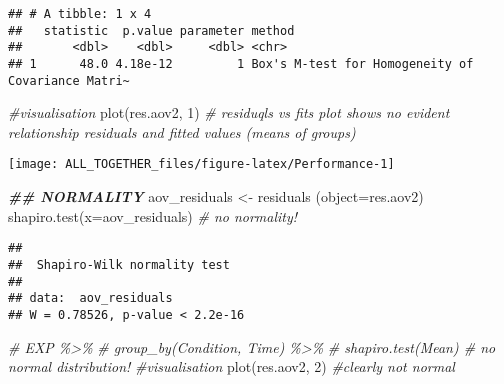 \documentclass[
]{article}
\newenvironment{Shaded}{\begin{snugshade}}{\end{snugshade}}
\newcommand{\AttributeTok}[1]{\textcolor[rgb]{0.77,0.63,0.00}{#1}}
\newcommand{\CommentTok}[1]{\textcolor[rgb]{0.56,0.35,0.01}{\textit{#1}}}
\newcommand{\ConstantTok}[1]{\textcolor[rgb]{0.00,0.00,0.00}{#1}}
\newcommand{\DecValTok}[1]{\textcolor[rgb]{0.00,0.00,0.81}{#1}}
\newcommand{\DocumentationTok}[1]{\textcolor[rgb]{0.56,0.35,0.01}{\textbf{\textit{#1}}}}
\newcommand{\FunctionTok}[1]{\textcolor[rgb]{0.00,0.00,0.00}{#1}}
\newcommand{\NormalTok}[1]{#1}
\newcommand{\OtherTok}[1]{\textcolor[rgb]{0.56,0.35,0.01}{#1}}
\newcommand{\SpecialCharTok}[1]{\textcolor[rgb]{0.00,0.00,0.00}{#1}}
\newcommand{\StringTok}[1]{\textcolor[rgb]{0.31,0.60,0.02}{#1}}
\begin{document}
\begin{Shaded}
\end{Shaded}

\begin{verbatim}
## # A tibble: 1 x 4
##   statistic  p.value parameter method                                           
##       <dbl>    <dbl>     <dbl> <chr>                                            
## 1      48.0 4.18e-12         1 Box's M-test for Homogeneity of Covariance Matri~
\end{verbatim}

\begin{Shaded}
\begin{Highlighting}[]
\CommentTok{\#visualisation}
\FunctionTok{plot}\NormalTok{(res.aov2, }\DecValTok{1}\NormalTok{) }\CommentTok{\# residuqls vs fits plot shows no evident relationship residuals and fitted values (means of groups)}
\end{Highlighting}
\end{Shaded}

\texttt{[image: ALL\_TOGETHER\_files/figure-latex/Performance-1]}

\begin{Shaded}
\begin{Highlighting}[]
\DocumentationTok{\#\# NORMALITY}
\NormalTok{aov\_residuals }\OtherTok{\textless{}{-}} \FunctionTok{residuals}\NormalTok{ (}\AttributeTok{object=}\NormalTok{res.aov2)}
\FunctionTok{shapiro.test}\NormalTok{(}\AttributeTok{x=}\NormalTok{aov\_residuals) }\CommentTok{\# no normality! }
\end{Highlighting}
\end{Shaded}

\begin{verbatim}
## 
##  Shapiro-Wilk normality test
## 
## data:  aov_residuals
## W = 0.78526, p-value < 2.2e-16
\end{verbatim}

\begin{Shaded}
\begin{Highlighting}[]
\CommentTok{\# EXP \%\textgreater{}\%}
\CommentTok{\#   group\_by(Condition, Time) \%\textgreater{}\%}
\CommentTok{\#   shapiro.test(Mean) \# no normal distribution!}
\CommentTok{\#visualisation}
\FunctionTok{plot}\NormalTok{(res.aov2, }\DecValTok{2}\NormalTok{) }\CommentTok{\#clearly not normal}
\end{Highlighting}
\end{Shaded}
\end{document}
